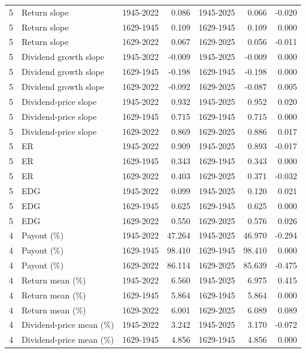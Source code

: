 \documentclass[10pt]{article}
\begin{document}
\begin{landscape}
\begin{longtable}{rllrlrr}
5 & Return slope & 1945-2022 & 0.086 & 1945-2025 & 0.066 & -0.020 \\
5 & Return slope & 1629-1945 & 0.109 & 1629-1945 & 0.109 & 0.000 \\
5 & Return slope & 1629-2022 & 0.067 & 1629-2025 & 0.056 & -0.011 \\
5 & Dividend growth slope & 1945-2022 & -0.009 & 1945-2025 & -0.009 & 0.000 \\
5 & Dividend growth slope & 1629-1945 & -0.198 & 1629-1945 & -0.198 & 0.000 \\
5 & Dividend growth slope & 1629-2022 & -0.092 & 1629-2025 & -0.087 & 0.005 \\
5 & Dividend-price slope & 1945-2022 & 0.932 & 1945-2025 & 0.952 & 0.020 \\
5 & Dividend-price slope & 1629-1945 & 0.715 & 1629-1945 & 0.715 & 0.000 \\
5 & Dividend-price slope & 1629-2022 & 0.869 & 1629-2025 & 0.886 & 0.017 \\
5 & ER & 1945-2022 & 0.909 & 1945-2025 & 0.893 & -0.017 \\
5 & ER & 1629-1945 & 0.343 & 1629-1945 & 0.343 & 0.000 \\
5 & ER & 1629-2022 & 0.403 & 1629-2025 & 0.371 & -0.032 \\
5 & EDG & 1945-2022 & 0.099 & 1945-2025 & 0.120 & 0.021 \\
5 & EDG & 1629-1945 & 0.625 & 1629-1945 & 0.625 & 0.000 \\
5 & EDG & 1629-2022 & 0.550 & 1629-2025 & 0.576 & 0.026 \\
4 & Payout (\%) & 1945-2022 & 47.264 & 1945-2025 & 46.970 & -0.294 \\
4 & Payout (\%) & 1629-1945 & 98.410 & 1629-1945 & 98.410 & 0.000 \\
4 & Payout (\%) & 1629-2022 & 86.114 & 1629-2025 & 85.639 & -0.475 \\
4 & Return mean (\%) & 1945-2022 & 6.560 & 1945-2025 & 6.975 & 0.415 \\
4 & Return mean (\%) & 1629-1945 & 5.864 & 1629-1945 & 5.864 & 0.000 \\
4 & Return mean (\%) & 1629-2022 & 6.001 & 1629-2025 & 6.089 & 0.089 \\
4 & Dividend-price mean (\%) & 1945-2022 & 3.242 & 1945-2025 & 3.170 & -0.072 \\
4 & Dividend-price mean (\%) & 1629-1945 & 4.856 & 1629-1945 & 4.856 & 0.000 \\
\end{longtable}


\end{landscape}
\end{document}
